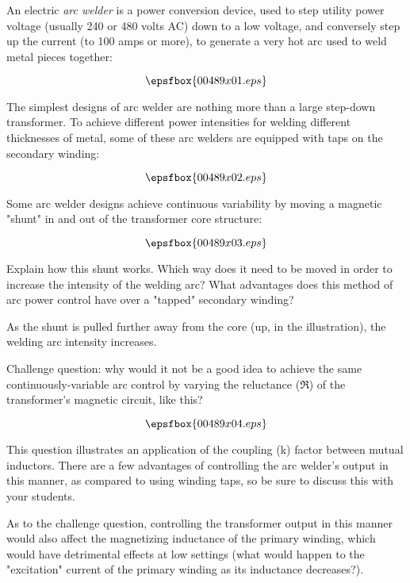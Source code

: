 

An electric {\it arc welder} is a power conversion device, used to step utility power voltage (usually 240 or 480 volts AC) down to a low voltage, and conversely step up the current (to 100 amps or more), to generate a very hot arc used to weld metal pieces together:

$$\epsfbox{00489x01.eps}$$

The simplest designs of arc welder are nothing more than a large step-down transformer.  To achieve different power intensities for welding different thicknesses of metal, some of these arc welders are equipped with taps on the secondary winding:

$$\epsfbox{00489x02.eps}$$

Some arc welder designs achieve continuous variability by moving a magnetic "shunt" in and out of the transformer core structure:

$$\epsfbox{00489x03.eps}$$

Explain how this shunt works.  Which way does it need to be moved in order to increase the intensity of the welding arc?  What advantages does this method of arc power control have over a "tapped" secondary winding?







As the shunt is pulled further away from the core (up, in the illustration), the welding arc intensity increases.

\vskip 10pt

Challenge question: why would it not be a good idea to achieve the same continuously-variable arc control by varying the reluctance ($\Re$) of the transformer's magnetic circuit, like this?

$$\epsfbox{00489x04.eps}$$







This question illustrates an application of the coupling (k) factor between mutual inductors.  There are a few advantages of controlling the arc welder's output in this manner, as compared to using winding taps, so be sure to discuss this with your students.

As to the challenge question, controlling the transformer output in this manner would also affect the magnetizing inductance of the primary winding, which would have detrimental effects at low settings (what would happen to the "excitation" current of the primary winding as its inductance decreases?).





